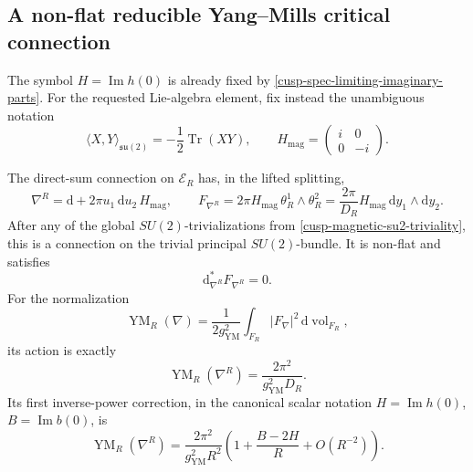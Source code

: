\subsection{A non-flat reducible Yang--Mills critical connection}

The symbol \(H=\operatorname{Im}h(0)\) is already fixed by
\cref{cusp-spec-limiting-imaginary-parts}.  For the requested Lie-algebra
element, fix instead the unambiguous notation
\begin{equation}
 \langle X,Y\rangle_{\mathfrak{su}(2)}
   =-\frac12\operatorname{Tr}(XY),
 \qquad
 H_{\mathrm{mag}}=\begin{pmatrix}i&0\\0&-i\end{pmatrix}.
 \label{cusp-magnetic-su2-normalization}
\end{equation}
\begin{theorem}
\label{cusp-magnetic-ym-critical-point}
The direct-sum connection on \(\mathscr E_R\) has, in the lifted splitting,
\begin{equation}
 \nabla^R=\mathrm d+2\pi u_1\,\mathrm du_2\,H_{\mathrm{mag}},
 \qquad
 F_{\nabla^R}
 =2\pi H_{\mathrm{mag}}\,\theta_R^1\wedge\theta_R^2
 =\frac{2\pi}{D_R}H_{\mathrm{mag}}\,\mathrm dy_1\wedge\mathrm dy_2.
 \label{cusp-magnetic-su2-curvature}
\end{equation}
After any of the global \(SU(2)\)-trivializations from
 \cref{cusp-magnetic-su2-triviality}, this is a connection on the
trivial principal \(SU(2)\)-bundle.  It is non-flat and satisfies
\[
 \mathrm d_{\nabla^R}^*F_{\nabla^R}=0.
\]
For the normalization
\begin{equation}
 \operatorname{YM}_R(\nabla)
 =\frac1{2g_{\mathrm{YM}}^2}
  \int_{F_R}\lvert F_\nabla\rvert^2\,
  \mathrm d\operatorname{vol}_{F_R},
 \label{cusp-magnetic-action-normalization}
\end{equation}
its action is exactly
\begin{equation}
 \operatorname{YM}_R(\nabla^R)
 =\frac{2\pi^2}{g_{\mathrm{YM}}^2D_R}.
 \label{cusp-magnetic-exact-action}
\end{equation}
Its first inverse-power correction, in the canonical scalar notation
\(H=\operatorname{Im}h(0)\), \(B=\operatorname{Im}b(0)\), is
\begin{equation}
 \operatorname{YM}_R(\nabla^R)
 =\frac{2\pi^2}{g_{\mathrm{YM}}^2R^2}
  \left(1+\frac{B-2H}{R}
  +O(R^{-2})\right).
 \label{cusp-magnetic-action-first-correction}
\end{equation}
\end{theorem}


